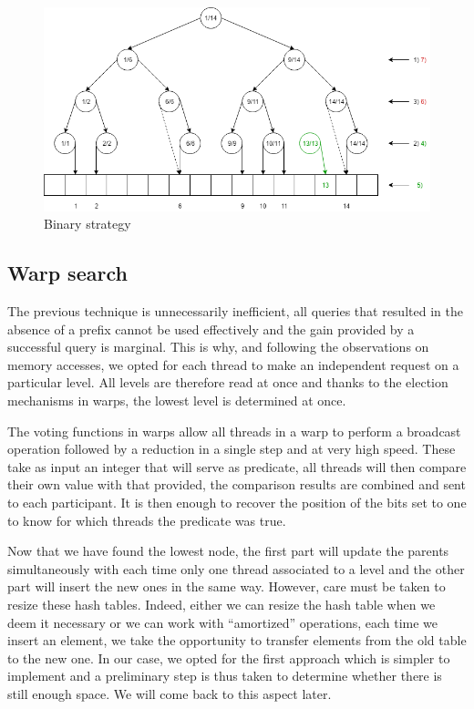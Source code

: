 \begin{figure}[!ht]
\centering
\includegraphics[width=\linewidth]{Chapters/XFastTries/Implementation/BinaryStrategy.png} 
\caption{Binary strategy}
\end{figure}

\subsection{Warp search}

The previous technique is unnecessarily inefficient, all queries that resulted in the absence of a prefix cannot be used effectively and the gain provided by a successful query is marginal. This is why, and following the observations on memory accesses, we opted for each thread to make an independent request on a particular level. All levels are therefore read at once and thanks to the election mechanisms in warps, the lowest level is determined at once.

The voting functions in warps allow all threads in a warp to perform a broadcast operation followed by a reduction in a single step and at very high speed. These take as input an integer that will serve as predicate, all threads will then compare their own value with that provided, the comparison results are combined and sent to each participant. It is then enough to recover the position of the bits set to one to know for which threads the predicate was true.

Now that we have found the lowest node, the first part will update the parents simultaneously with each time only one thread associated to a level and the other part will insert the new ones in the same way. However, care must be taken to resize these hash tables. Indeed, either we can resize the hash table when we deem it necessary or we can work with ``amortized'' operations, each time we insert an element, we take the opportunity to transfer elements from the old table to the new one. In our case, we opted for the first approach which is simpler to implement and a preliminary step is thus taken to determine whether there is still enough space. We will come back to this aspect later.


